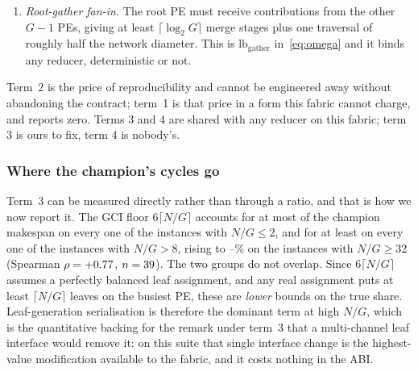 \documentclass[journal,10pt]{IEEEtran}
\theoremstyle{plain}
\theoremstyle{definition}
\theoremstyle{remark}
\begin{document}
\begin{enumerate}
  $6\lceil N/G\rceil$ cycles producing them, and this floor grows with the
  leaves each PE holds, so it binds hardest at \emph{high} $N/G$ --- the
  regime in which the reduction has the most work to overlap it with, and
  still cannot. Unlike term~2, this term is an artefact of
  \emph{our} GCI, not of the ABI, and a multi-channel leaf interface would
  remove it.
\item \emph{Root-gather fan-in.} The root PE must receive contributions from
  the other $G-1$ PEs, giving at least $\lceil\log_2 G\rceil$ merge stages
  plus one traversal of roughly half the network diameter. This is
  $\mathrm{lb}_{\text{gather}}$ in~\eqref{eq:omega} and it binds any reducer,
  deterministic or not.
\end{enumerate}

Term~2 is the price of reproducibility and cannot be engineered away without
abandoning the contract; term~1 is that price in a form this fabric cannot
charge, and reports zero. Terms 3 and 4 are shared with any reducer on
this fabric; term 3 is ours to fix, term 4 is nobody's.

\subsubsection{Where the champion's cycles go}

Term~3 can be measured directly rather than through a ratio, and that is how
we now report it. The GCI floor $6\lceil N/G\rceil$ accounts for at most
\GciShareLowMax{} of the champion makespan on every one of the \GciLowInst{}
instances with $N/G \le 2$, and for at least \GciShareHighMin{} on every one
of the \GciHighInst{} instances with $N/G > 8$, rising to
\GciShareTopLo{}--\GciShareTopHi{}\% on the \GciTopInst{} instances with
$N/G \ge 32$ (Spearman $\rho = +0.77{}$, $n = 39{}$). The two
groups do not overlap. Since $6\lceil N/G\rceil$ assumes a perfectly balanced
leaf assignment, and any real assignment puts at least $\lceil N/G\rceil$
leaves on the busiest PE, these are \emph{lower} bounds on the true share.
Leaf-generation serialisation is therefore the dominant term at high $N/G$,
which is the quantitative backing for the remark under term~3 that a
multi-channel leaf interface would remove it: on this suite that single
interface change is the highest-value modification available to the fabric,
and it costs nothing in the ABI.
\end{document}
